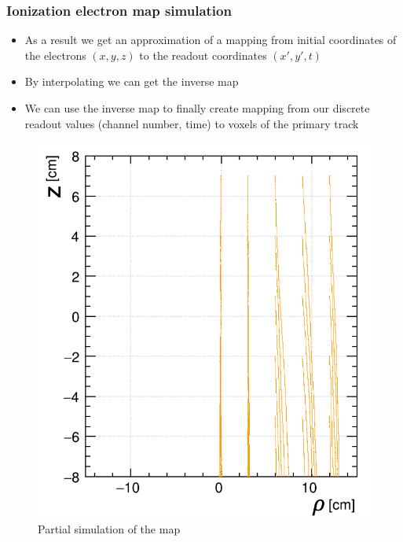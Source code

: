 \documentclass{beamer}
\begin{document}
	\begin{frame}
		\frametitle{Ionization electron map simulation}
		\begin{itemize}
			\item As a result we get an approximation of a mapping from initial coordinates of the electrons $(x,y,z)$ to the readout coordinates $(x',y',t)$
			\item By interpolating we can get the inverse map
			\item We can use the inverse map to finally create mapping from our discrete readout values (channel number, time) to voxels of the primary track
		\end{itemize}
		\begin{figure}
			\centering
			\includegraphics[height=0.4\textheight]{images/map_lines.png}
			\caption{Partial simulation of the map}
		\end{figure}
	\end{frame}
\end{document}
